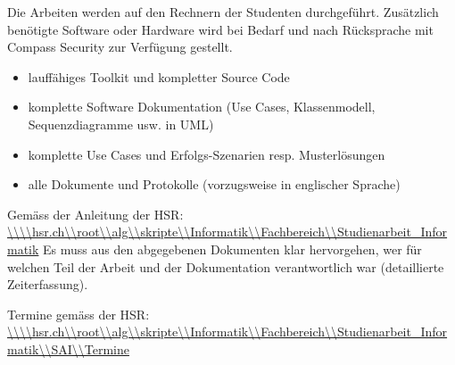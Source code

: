 Die Arbeiten werden auf den Rechnern der Studenten durchgeführt. Zusätzlich benötigte Software oder Hardware wird bei Bedarf und nach Rücksprache mit Compass Security zur Verfügung gestellt. 

\thispagestyle{plain}
\begin{itemize}
    \item lauffähiges Toolkit und kompletter Source Code
    \item komplette Software Dokumentation (Use Cases, Klassenmodell, Sequenzdiagramme usw. in UML)
    \item komplette Use Cases und Erfolgs-Szenarien resp. Musterlösungen
    \item alle Dokumente und Protokolle (vorzugsweise in englischer Sprache)
\end{itemize}

Gemäss der Anleitung der HSR: \url{\\\\hsr.ch\\root\\alg\\skripte\\Informatik\\Fachbereich\\Studienarbeit_Informatik}
Es muss aus den abgegebenen Dokumenten klar hervorgehen, wer für welchen Teil der Arbeit und der Dokumentation verantwortlich war (detaillierte Zeiterfassung).

\thispagestyle{plain}
Termine gemäss der HSR: \url{\\\\hsr.ch\\root\\alg\\skripte\\Informatik\\Fachbereich\\Studienarbeit_Informatik\\SAI\\Termine}

